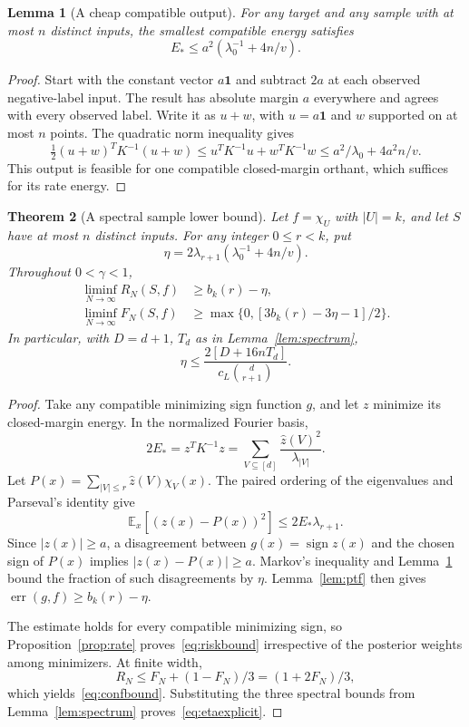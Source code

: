 \documentclass[11pt]{article}
\newtheorem{theorem}{Theorem}[section]
\newtheorem{lemma}[theorem]{Lemma}
\theoremstyle{remark}\newtheorem{remark}[theorem]{Remark}
\newcommand{\E}{\mathbb E}\newcommand{\Pp}{\mathbb P}
\DeclareMathOperator{\sign}{sign}\DeclareMathOperator{\Var}{Var}
\begin{document}
\begin{lemma}[A cheap compatible output]\label{lem:competitor}
For any target and any sample with at most $n$ distinct inputs,
the smallest compatible energy satisfies
\begin{equation}\label{eq:competitor}
 E_*\le a^2\left(\lambda_0^{-1}+4n/v\right).
\end{equation}
\end{lemma}
\begin{proof}
Start with the constant vector $a\mathbf1$ and subtract $2a$ at
each observed negative-label input. The result has absolute margin
$a$ everywhere and agrees with every observed label. Write it as
$u+w$, with $u=a\mathbf1$ and $w$ supported on at most $n$ points.
The quadratic norm inequality gives
\[
 \tfrac12(u+w)^TK^{-1}(u+w)
 \le u^TK^{-1}u+w^TK^{-1}w
 \le a^2/\lambda_0+4a^2n/v.
\]
This output is feasible for one compatible closed-margin orthant,
which suffices for its rate energy.
\end{proof}

\begin{theorem}[A spectral sample lower bound]\label{thm:spectral}
Let $f=\chi_U$ with $|U|=k$, and let $S$ have at most $n$ distinct
inputs. For any integer $0\le r<k$, put
\[
 \eta=2\lambda_{r+1}\left(\lambda_0^{-1}+4n/v\right).
\]
Throughout $0<\gamma<1$,
\begin{align}
 \liminf_{N\to\infty}R_N(S,f)&\ge b_k(r)-\eta,\label{eq:riskbound}\\
 \liminf_{N\to\infty}F_N(S,f)&\ge
 \max\{0,[3b_k(r)-3\eta-1]/2\}.\label{eq:confbound}
\end{align}
In particular, with $D=d+1$, $T_d$ as in Lemma~\ref{lem:spectrum},
\begin{equation}\label{eq:etaexplicit}
 \eta\le\frac{2[D+16nT_d]}{c_L\binom d{r+1}}.
\end{equation}
\end{theorem}

\begin{proof}
Take any compatible minimizing sign function $g$, and let $z$
minimize its closed-margin energy. In the normalized Fourier basis,
\[
 2E_* =z^TK^{-1}z
       =\sum_{V\subseteq[d]}\frac{\widehat z(V)^2}{\lambda_{|V|}}.
\]
Let $P(x)=\sum_{|V|\le r}\widehat z(V)\chi_V(x)$. The paired
ordering of the eigenvalues and Parseval's identity give
\[
 \E_x[(z(x)-P(x))^2]\le2E_*\lambda_{r+1}.
\]
Since $|z(x)|\ge a$, a disagreement between $g(x)=\sign z(x)$
and the chosen sign of $P(x)$ implies $|z(x)-P(x)|\ge a$.
Markov's inequality and Lemma~\ref{lem:competitor} bound the
fraction of such disagreements by $\eta$. Lemma~\ref{lem:ptf}
then gives $\operatorname{err}(g,f)\ge b_k(r)-\eta$.

The estimate holds for every compatible minimizing sign, so
Proposition~\ref{prop:rate} proves~\eqref{eq:riskbound} irrespective
of the posterior weights among minimizers. At finite width,
\[
 R_N\le F_N+(1-F_N)/3=(1+2F_N)/3,
\]
which yields~\eqref{eq:confbound}. Substituting the three spectral
bounds from Lemma~\ref{lem:spectrum} proves~\eqref{eq:etaexplicit}.
\end{proof}
\end{document}
